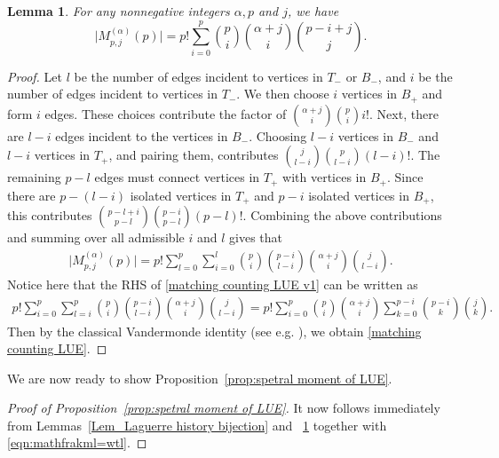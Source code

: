 \documentclass{amsart}
\theoremstyle{plain}
\newtheorem{lem}[thm]{Lemma}
\theoremstyle{remark}
\numberwithin{equation}{section}
\begin{document}
\begin{lem} \label{Lem_mathcing counting LUE}
For any nonnegative integers $\alpha,p $ and $j$, we have  
\begin{equation} \label{matching counting LUE}
\Big|M_{p,j}^{(\alpha)}(p)\Big|= p! \sum_{i=0}^{p} \binom{p}{i}  \binom{\alpha+j}{i}   \binom{p-i+j}{j}.
\end{equation}
\end{lem}
\begin{proof}
Let $l$ be the number of edges incident to vertices in $T_{-}$ or $B_{-}$, and $i$ be the number of edges incident to vertices in $T_{-}$. We then choose $i$ vertices in $B_{+}$ and form $i$ edges. These choices contribute the factor of $ \binom{\alpha+j}{i}\binom{p}{i}i!.$ 
Next, there are $l-i$ edges incident to the vertices in $B_{-}$. Choosing $l-i$ vertices in $B_{-}$ and $l-i$ vertices in $T_{+}$, and pairing them, contributes $\binom{j}{l-i}\binom{p}{l-i}(l-i)!.$ 
The remaining $p-l$ edges must connect vertices in $T_{+}$ with vertices in $B_{+}$. Since there are $p-(l-i)$ isolated vertices in $T_{+}$ and $p-i$ isolated vertices in $B_{+}$, this contributes $ \binom{p-l+i}{p-l}\binom{p-i}{p-l}(p-l)!.$ 
Combining the above contributions and summing over all admissible $i$ and $l$ gives that 
\begin{align} \label{matching counting LUE v1}
\Big|M_{p,j}^{(\alpha)}(p)\Big|= p! \sum_{l=0}^{p}\sum_{i=0}^{l} \binom{p}{i} \binom{p-i}{l-i} \binom{\alpha+j}{i}\binom{j}{l-i}.
\end{align}
Notice here that the RHS of \eqref{matching counting LUE v1} can be written as 
\begin{align*}
p!  \sum_{i=0}^{p}\sum_{l=i}^{p} \binom{p}{i} \binom{p-i}{l-i} \binom{\alpha+j}{i}\binom{j}{l-i} = p!  \sum_{i=0}^{p} \binom{p}{i}  \binom{\alpha+j}{i}  \sum_{k=0}^{p-i} \binom{p-i}{k} \binom{j}{k}.   
\end{align*}
Then by the classical Vandermonde identity (see e.g. \cite[p. 190]{Stanley12}), we obtain \eqref{matching counting LUE}.  
\end{proof}

We are now ready to show Proposition~\ref{prop:spetral moment of LUE}. 

\begin{proof}[Proof of Proposition~\ref{prop:spetral moment of LUE}]
It now follows immediately from Lemmas~\ref{Lem_Laguerre history bijection} and ~\ref{Lem_mathcing counting LUE} together with \eqref{eqn:mathfrakml=wtl}. 
\end{proof}
\end{document}
